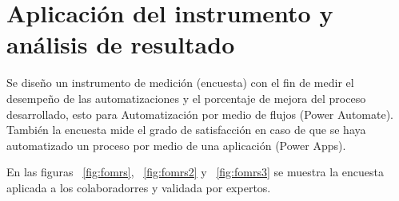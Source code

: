 \section{Aplicación del instrumento y análisis de resultado}


Se diseño un instrumento de medición (encuesta) con el fin de medir el desempeño de las automatizaciones y el porcentaje de mejora del proceso desarrollado, esto para Automatización por medio de flujos (Power Automate). También la encuesta mide el grado de satisfacción en caso de que se haya automatizado un proceso
por medio de una aplicación (Power Apps).



En las figuras ~\ref{fig:fomrs}, ~\ref{fig:fomrs2} y ~\ref{fig:fomrs3} se muestra la encuesta aplicada a los colaboradorres y validada por expertos.

